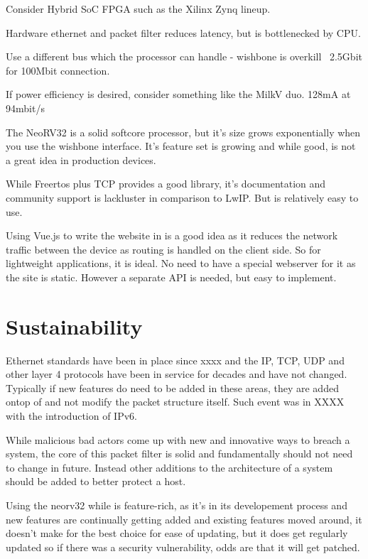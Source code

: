 Consider Hybrid SoC FPGA such as the Xilinx Zynq lineup.

Hardware ethernet and packet filter reduces latency, but is bottlenecked by CPU.

Use a different bus which the processor can handle - wishbone is overkill ~2.5Gbit for 100Mbit connection.

If power efficiency is desired, consider something like the MilkV duo. 128mA at 94mbit/s

The NeoRV32 is a solid softcore processor, but it's size grows exponentially when you use the wishbone interface. It's feature set is growing and while good, is not a great idea in production devices. 


While Freertos plus TCP provides a good library, it's documentation and community support is lackluster in comparison to LwIP. But is relatively easy to use. 
 
Using Vue.js to write the website in is a good idea as it reduces the network traffic between the device as routing is handled on the client side. So for lightweight applications, it is ideal. No need to have a special webserver for it as the site is static. However a separate API is needed, but easy to implement. 



\section{Sustainability}

Ethernet standards have been in place since xxxx and the IP, TCP, UDP and other layer 4 protocols have been in service for decades and have not changed. Typically if new features do need to be added in these areas, they are added ontop of and not modify the packet structure itself. Such event was in XXXX with the introduction of IPv6.

While malicious bad actors come up with new and innovative ways to breach a system, the core of this packet filter is solid and fundamentally should not need to change in future. Instead other additions to the architecture of a system should be added to better protect a host. 

Using the neorv32 while is feature-rich, as it's in its developement process and new features are continually getting added and existing features moved around, it doesn't make for the best choice for ease of updating, but it does get regularly updated so if there was a security vulnerability, odds are that it will get patched.

